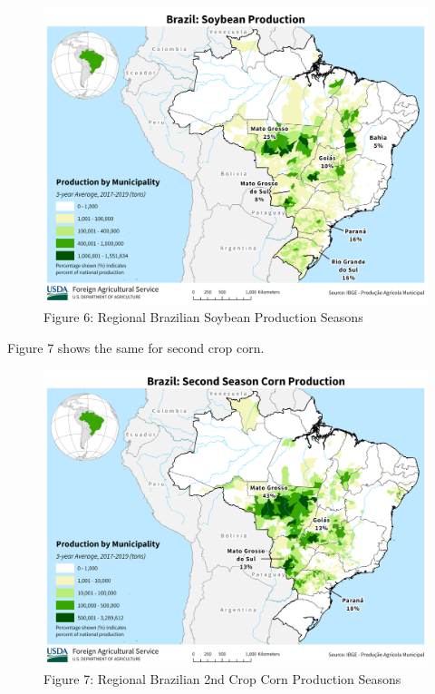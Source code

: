 \documentclass[
  letterpaper,
  DIV=11,
  numbers=noendperiod]{scrreprt}
\begin{document}
\begin{figure}

{\centering \includegraphics{assets/Brazil_Soybean.png}

}

\caption{Figure 6: Regional Brazilian Soybean Production Seasons}

\end{figure}

Figure 7 shows the same for second crop corn.

\begin{figure}

{\centering \includegraphics{assets/Brazil_SecondSeason_Corn.png}

}

\caption{Figure 7: Regional Brazilian 2nd Crop Corn Production Seasons}

\end{figure}
\end{document}
